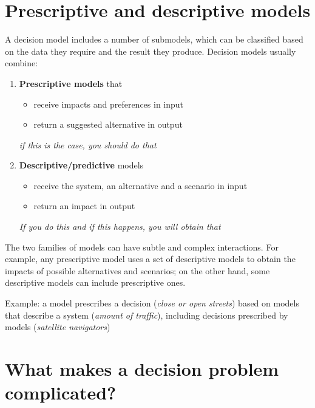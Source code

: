 \section{Prescriptive and descriptive models}

A decision model includes a number of submodels, which can be classified based on the data they require and the result they produce. Decision models usually combine:
\begin{enumerate}
	\item \textbf{Prescriptive models} that
	\begin{itemize}
		\item receive impacts and preferences in input
		
		\item return a suggested alternative in output
	\end{itemize}
	\textit{if this is the case, you should do that}
	
	\item \textbf{Descriptive/predictive} models
	\begin{itemize}
		\item receive the system, an alternative and a scenario in input
		
		\item return an impact in output
	\end{itemize}
	\textit{If you do this and if this happens, you will obtain that}
\end{enumerate}

The two families of models can have subtle and complex interactions. For example, any prescriptive model uses a set of descriptive models to obtain the impacts of possible alternatives and scenarios; on the other hand, some descriptive models can include prescriptive ones.

Example: a model prescribes  a decision (\textit{close or open streets}) based on models that describe a system (\textit{amount of traffic}), including decisions prescribed by models (\textit{satellite navigators})

\section{What makes a decision problem complicated?}

